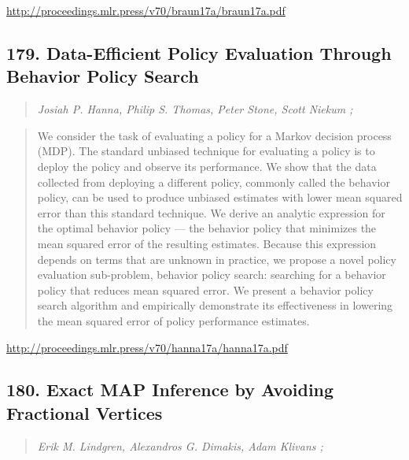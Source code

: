 \documentclass{article}
\begin{document}
\href{http://proceedings.mlr.press/v70/braun17a/braun17a.pdf}{http://proceedings.mlr.press/v70/braun17a/braun17a.pdf}

\subsection{179. Data-Efficient Policy Evaluation Through Behavior Policy Search}

\begin{quote}
\footnotesize{\textit{Josiah P. Hanna, Philip S. Thomas, Peter Stone, Scott Niekum ;}}
\end{quote}

\begin{quote}
    We consider the task of evaluating a policy for a Markov decision process (MDP). The standard unbiased technique for evaluating a policy is to deploy the policy and observe its performance. We show that the data collected from deploying a different policy, commonly called the behavior policy, can be used to produce unbiased estimates with lower mean squared error than this standard technique. We derive an analytic expression for the optimal behavior policy — the behavior policy that minimizes the mean squared error of the resulting estimates. Because this expression depends on terms that are unknown in practice, we propose a novel policy evaluation sub-problem, behavior policy search: searching for a behavior policy that reduces mean squared error. We present a behavior policy search algorithm and empirically demonstrate its effectiveness in lowering the mean squared error of policy performance estimates.  \end{quote}

\href{http://proceedings.mlr.press/v70/hanna17a/hanna17a.pdf}{http://proceedings.mlr.press/v70/hanna17a/hanna17a.pdf}

\subsection{180. Exact MAP Inference by Avoiding Fractional Vertices}

\begin{quote}
\footnotesize{\textit{Erik M. Lindgren, Alexandros G. Dimakis, Adam Klivans ;}}
\end{quote}
\end{document}
